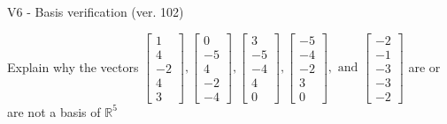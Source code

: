 \begin{exercise}
  \begin{exerciseTitle}V6 - Basis verification (ver. 102)\end{exerciseTitle}
  \begin{exerciseStatement}
    Explain why the vectors \(\left[\begin{array}{r}
1 \\
4 \\
-2 \\
4 \\
3
\end{array}\right] , \left[\begin{array}{r}
0 \\
-5 \\
4 \\
-2 \\
-4
\end{array}\right] , \left[\begin{array}{r}
3 \\
-5 \\
-4 \\
4 \\
0
\end{array}\right] , \left[\begin{array}{r}
-5 \\
-4 \\
-2 \\
3 \\
0
\end{array}\right] , \text{ and } \left[\begin{array}{r}
-2 \\
-1 \\
-3 \\
-3 \\
-2
\end{array}\right]\) are or are not a basis of \(\mathbb{R}^5\)	



\end{exerciseStatement}
\end{exercise}
